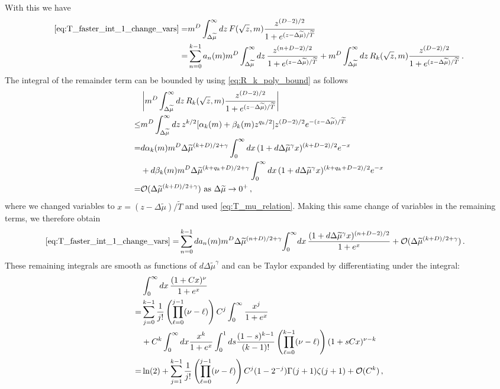\documentclass[sn-mathphys,Numbered]{sn-jnl}
\begin{document}
With this we have
\begin{align}
\eqref{eq:T_faster_int_1_change_vars} =&m^{D}\int_{\Delta\widetilde{\mu}}^\infty dz\, F(\sqrt{z},m)    \frac{z^{(D-2)/2}}{1+e^{(z-\Delta\widetilde{\mu})/\widetilde{T}}} \\
=& \sum_{n=0}^{k-1} a_n(m)m^{D}\int_{\Delta\widetilde{\mu}}^\infty dz\, \frac{z^{(n+D-2)/2}}{1+e^{(z-\Delta\widetilde{\mu})/\widetilde{T}}}+m^{D}\int_{\Delta\widetilde{\mu}}^\infty dz\,R_k(\sqrt{z},m)\frac{z^{(D-2)/2}}{1+e^{(z-\Delta\widetilde{\mu})/\widetilde{T}}}\,.\notag
\end{align}
The integral of the remainder term can be bounded by using \eqref{eq:R_k_poly_bound} as follows
\begin{align}
   &\left|m^{D}\int_{\Delta\widetilde{\mu}}^\infty dz\,R_k(\sqrt{z},m)\frac{z^{(D-2)/2}}{1+e^{(z-\Delta\widetilde{\mu})/\widetilde{T}}}\right|\\
   \leq&m^{D}\int_{\Delta\widetilde{\mu}}^\infty dz\,z^{k/2}[\alpha_k(m)+\beta_k(m)z^{q_k/2}]z^{(D-2)/2}e^{-(z-\Delta\widetilde{\mu})/\widetilde{T}}\notag\\
=&d\alpha_k(m)m^{D}\Delta\widetilde{\mu}^{(k+D)/2+\gamma}\int_{0}^\infty dx\,(1+d\Delta\widetilde{\mu}^{\gamma}x)^{(k+D-2)/2}e^{-x}\notag\\
&+d\beta_k(m)m^{D}\Delta\widetilde{\mu}^{(k+q_k+D)/2+\gamma}\int_{0}^\infty dx\,(1+d\Delta\widetilde{\mu}^{\gamma}x)^{(k+q_k+D-2)/2}e^{-x}\notag\\   
=&\mathcal{O}(\Delta\widetilde{\mu}^{(k+D)/2+\gamma})\text{ as } \Delta\widetilde{\mu}\to 0^+\,,\label{eq:T_faster_remainder_bound}
\end{align}
where we changed variables to $x=(z-\Delta\widetilde{\mu})/\widetilde{T}$ and used \eqref{eq:T_mu_relation}.  Making this same change of variables in the remaining terms, we  therefore obtain
\begin{align}\label{eq:T_faster_int_1_change_vars_expanded1}
\eqref{eq:T_faster_int_1_change_vars} =& \sum_{n=0}^{k-1} da_n(m)m^{D}\Delta\widetilde{\mu}^{(n+D)/2+\gamma}\!\int_{0}^\infty\! dx\, \frac{(1+d\Delta\widetilde{\mu}^{\gamma}x)^{(n+D-2)/2}}{1+e^{x}}+\mathcal{O}(\Delta\widetilde{\mu}^{(k+D)/2+\gamma})\,.
\end{align}
These remaining integrals are smooth as functions of $d\Delta\widetilde{\mu}^\gamma$ and can be Taylor expanded by differentiating under the integral:
\begin{align}\label{eq:aux_int_expansion1}
&\int_0^\infty dx\, \frac{(1+C x)^\nu}{1+e^x}\\
=&\sum_{j=0}^{k-1}\frac{1}{j!} \left(\prod_{\ell=0}^{j-1}(\nu-\ell) \right)C^j\int_0^\infty \frac{x^j}{1+e^x} \notag\\
&+C^k\int_0^\infty dx \frac{x^k}{1+e^x} \int_0^1 ds\frac{(1-s)^{k-1}}{(k-1)!}  \left(\prod_{\ell=0}^{k-1}(\nu-\ell)\right)(1+sCx)^{\nu-k}\notag\\
=&\ln(2)+\sum_{j=1}^{k-1}\frac{1}{j!} \left(\prod_{\ell=0}^{j-1}(\nu-\ell) \right)C^j  (1 - 2^{-j}) \Gamma(j+1) \zeta(j+1) +\mathcal{O}(C^k)\,, \notag
\end{align}
\end{document}
